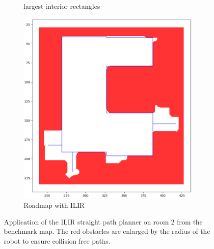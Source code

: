 \begin{figure}[h]
\begin{subfigure}{.33\textwidth}
      \caption{largest interior rectangles}
    \end{subfigure}%
    \begin{subfigure}{.33\textwidth}
      \centering
      \includegraphics[width=\textwidth]{figures/50_implementation/ryu_room2_roadmap.png}
      \caption{Roadmap with ILIR}
    \end{subfigure}
    \caption[Application of the ILIR straight path planner on room 2 from the benchmark map]{Application of the ILIR straight path planner on room 2 from the benchmark map. The red obstacles are enlarged by the radius of the robot to ensure collision free paths.}
    \label{fig:ilir_room_roadmap}
\end{figure}

